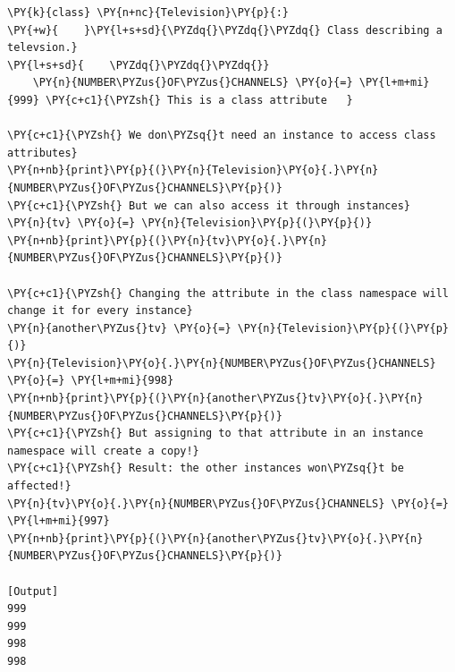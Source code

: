 \begin{Verbatim}[label=\makebox{\url{https://github.com/lucabaldini/cmepda/tree/master/slides/latex/snippets/class\_attributes\_3.py}},commandchars=\\\{\}]
\PY{k}{class} \PY{n+nc}{Television}\PY{p}{:}
\PY{+w}{    }\PY{l+s+sd}{\PYZdq{}\PYZdq{}\PYZdq{} Class describing a televsion.}
\PY{l+s+sd}{    \PYZdq{}\PYZdq{}\PYZdq{}}
    \PY{n}{NUMBER\PYZus{}OF\PYZus{}CHANNELS} \PY{o}{=} \PY{l+m+mi}{999} \PY{c+c1}{\PYZsh{} This is a class attribute   }
    
\PY{c+c1}{\PYZsh{} We don\PYZsq{}t need an instance to access class attributes}
\PY{n+nb}{print}\PY{p}{(}\PY{n}{Television}\PY{o}{.}\PY{n}{NUMBER\PYZus{}OF\PYZus{}CHANNELS}\PY{p}{)}
\PY{c+c1}{\PYZsh{} But we can also access it through instances}
\PY{n}{tv} \PY{o}{=} \PY{n}{Television}\PY{p}{(}\PY{p}{)}
\PY{n+nb}{print}\PY{p}{(}\PY{n}{tv}\PY{o}{.}\PY{n}{NUMBER\PYZus{}OF\PYZus{}CHANNELS}\PY{p}{)}

\PY{c+c1}{\PYZsh{} Changing the attribute in the class namespace will change it for every instance}
\PY{n}{another\PYZus{}tv} \PY{o}{=} \PY{n}{Television}\PY{p}{(}\PY{p}{)}
\PY{n}{Television}\PY{o}{.}\PY{n}{NUMBER\PYZus{}OF\PYZus{}CHANNELS} \PY{o}{=} \PY{l+m+mi}{998}
\PY{n+nb}{print}\PY{p}{(}\PY{n}{another\PYZus{}tv}\PY{o}{.}\PY{n}{NUMBER\PYZus{}OF\PYZus{}CHANNELS}\PY{p}{)}
\PY{c+c1}{\PYZsh{} But assigning to that attribute in an instance namespace will create a copy!}
\PY{c+c1}{\PYZsh{} Result: the other instances won\PYZsq{}t be affected!}
\PY{n}{tv}\PY{o}{.}\PY{n}{NUMBER\PYZus{}OF\PYZus{}CHANNELS} \PY{o}{=} \PY{l+m+mi}{997}
\PY{n+nb}{print}\PY{p}{(}\PY{n}{another\PYZus{}tv}\PY{o}{.}\PY{n}{NUMBER\PYZus{}OF\PYZus{}CHANNELS}\PY{p}{)}

[Output]
999
999
998
998
\end{Verbatim}